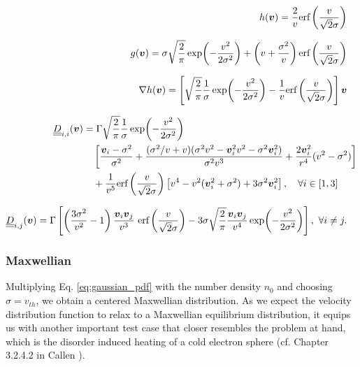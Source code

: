 \begin{subequations}
\label{eq:gaussian_sols}
\begin{align}
    \begin{split}
    h(\vect v)                &= \frac{2}{v} \text{erf}\left( \frac{v}{\sqrt{2} \sigma} \right)
    \end{split}
    \eqVspace
    \begin{split}
    g(\vect v)                &= \sigma \sqrt{\frac{2}{\pi}} \exp(- \frac{v^2}{2 \sigma^2}) +
    \left(v + \frac{\sigma^2}{v}\right) \text{erf}\left( \frac{v}{\sqrt{2}\sigma} \right)
    \end{split}
    \eqVspace
    \begin{split}
    \nabla h(\vect v)         &= \left [ \sqrt{\frac{2}{\pi}} \frac{1}{\sigma} \exp(- \frac{v^2}{2
    \sigma^2}) - \frac{1}{v} \text{erf} \left( \frac{v}{\sqrt{2} \sigma} \right) \right ]  \vect v
    \end{split}
    \eqVspace
    \begin{split}
    \matr D_{i,i}(\vect v) &= \Gamma \sqrt{\frac{2}{\pi}} \frac{1}{\sigma} \exp(-\frac{v^2}{2 \sigma^2}) \\
                        & \quad \left[ \frac{\vect v_i - \sigma^2}{\sigma^2} + \frac{(\sigma^2 /
                        v + v) (\sigma^2 v^2 - \vect v_i^2 v^2 - \sigma^2
                \vect v_i^2)}{\sigma^2 v^3} + \frac{2 \vect v_i^2}{r^4}(v^2 - \sigma^2) \right] \\ 
                        & \quad + \frac{1}{v^5} \text{erf}\left( \frac{v}{\sqrt{2}\sigma} \right)
                        \left[ v^4 - v^2(\vect v_i^2 + \sigma^2) + 3 \sigma^2 \vect v_i^2
                        \right], \quad \forall i \in [1,3]
    \end{split}
    \eqVspace
    \begin{split}
        \matr D_{i,j}(\vect v)  &= \Gamma \left[ \left( \frac{3\sigma^2}{v^2} - 1 \right)
    \frac{\vect v_i \vect v_j}{v^3}\ \text{erf} \left( \frac{v}{\sqrt{2} \sigma} \right) - 3\sigma
\sqrt{\frac{2}{\pi}} \frac{\vect v_i \vect v_j}{v^4} \exp(- \frac{v^2}{2 \sigma^2}) \right],
\ \forall i \neq j.
    \end{split}
\end{align}
\end{subequations}

\subsubsection{Maxwellian}
\label{sub:maxwellian}

Multiplying Eq. \ref{eq:gaussian_pdf} with the number density $n_0$ and choosing $\sigma = v_{th}$, we obtain a centered Maxwellian distribution.
As we expect the velocity distribution function to relax to a Maxwellian
equilibrium distribution, it equips us with another important test case that closer resembles the
problem at hand, which is the disorder induced heating of a cold electron sphere (cf. Chapter 3.2.4.2 in Callen \cite{Callen}).
